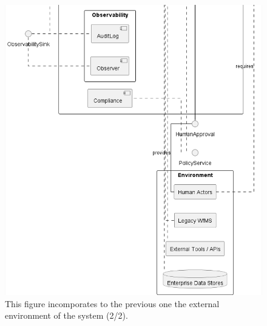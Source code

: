\clearpage
\begin{figure}[htbp]
  \centering
  \includegraphics[width=0.9\linewidth]{ressources/MAS/diagrams/MAS_arch_and_environment2.png}
  \caption{This figure incomporates to the previous one the external environment of the system (2/2).}
  \label{fig:app-mas-arch-mod}
\end{figure}

\clearpage
